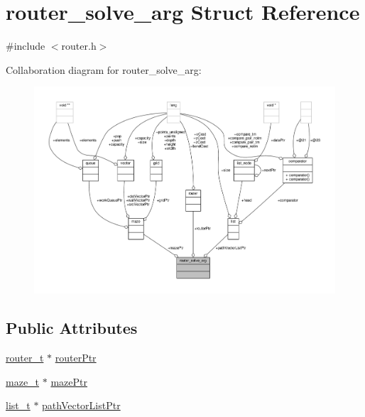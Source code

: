 \hypertarget{structrouter__solve__arg}{\section{router\-\_\-solve\-\_\-arg Struct Reference}
\label{structrouter__solve__arg}
}


{\ttfamily \#include $<$router.\-h$>$}



Collaboration diagram for router\-\_\-solve\-\_\-arg\-:
\nopagebreak
\begin{figure}[H]
\begin{center}
\leavevmode
\includegraphics[width=350pt]{structrouter__solve__arg__coll__graph}
\end{center}
\end{figure}
\subsection*{Public Attributes}
\begin{DoxyCompactItemize}
\item 
\hyperlink{router_8h_a027679db3515967427aea1f9e7e51d4d}{router\-\_\-t} $\ast$ \hyperlink{structrouter__solve__arg_a8d92e62810830f105c1aed9a07d1b871}{router\-Ptr}
\item 
\hyperlink{maze_8h_a1d02565ad0978a0b57d9d066843e2db1}{maze\-\_\-t} $\ast$ \hyperlink{structrouter__solve__arg_a04601317b05ce293c55299b51c3d6db4}{maze\-Ptr}
\item 
\hyperlink{list_8h_af629e6a6713d7de11eab50cbe6449b06}{list\-\_\-t} $\ast$ \hyperlink{structrouter__solve__arg_add676eeff9cb2e5be2f617c8c4e38524}{path\-Vector\-List\-Ptr}
\end{DoxyCompactItemize}


